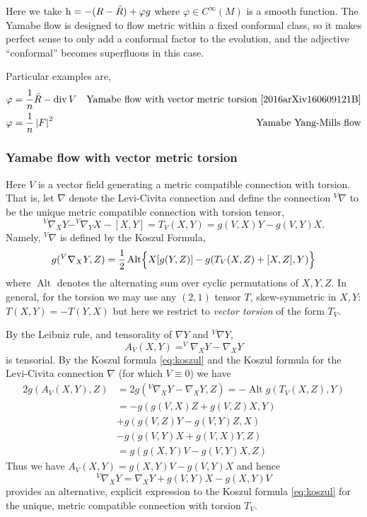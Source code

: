 \documentclass{amsart}
\begin{document}
Here we take \(\operatorname{h} = -(R - \bar{R}) + \varphi g\) where \(\varphi \in C^{\infty}(M)\) is a smooth function. The Yamabe flow is designed to flow metric within a fixed conformal class, so it makes perfect sense to only add a conformal factor to the evolution, and the adjective ``conformal'' becomes superfluous in this case.

Particular examples are,
\begin{align*}
\varphi &= \frac{1}{n} \bar{R} - \operatorname{div} V & \text{Yamabe flow with vector metric torsion \cite{2016arXiv160609121B}} \\
\varphi &= \frac{1}{n} \left|{F}\right|^2 & \text{Yamabe Yang-Mills flow}
\end{align*}

\subsubsection*{Yamabe flow with vector metric torsion}

Here \(V\) is a vector field generating a metric compatible connection with torsion. That is, let \(\nabla\) denote the Levi-Civita connection and define the connection \(^{V}\nabla\) to be the unique metric compatible connection with torsion tensor,
\begin{equation}
\label{eq:vector_torsion}
^{V}\nabla_X Y - ^{V}\nabla_Y X - [X, Y] = T_V(X, Y) = g(V, X) Y - g(V, Y) X.
\end{equation}
Namely, \(^{V}\nabla\) is defined by the Koszul Formula,
\begin{equation}
\label{eq:koszul}
g(^{V}\nabla_X Y, Z) = \frac{1}{2} \operatorname{Alt} \Bigl\{X[g(Y, Z)] - g(T_V(X, Z) + [X, Z], Y)\Bigr\}
\end{equation}
where $\operatorname{Alt}$ denotes the alternating sum over cyclic permutations of $X, Y, Z$. In general, for the torsion we may use any \((2, 1)\) tensor \(T\), skew-symmetric in \(X, Y\): \(T(X, Y) = -T(Y, X)\) but here we restrict to \emph{vector torsion} of the form \(T_V\).

By the Leibniz rule, and tensorality of \(\nabla Y\) and \(^{V}\nabla Y\),
\[
A_V(X, Y) = ^{V}\nabla_X Y - \nabla_X Y
\]
is tensorial. By the Koszul formula \eqref{eq:koszul} and the Koszul formula for the Levi-Civita connection \(\nabla\) (for which \(V \equiv 0\)) we have
\[
\begin{split}
2 g(A_V(X, Y), Z) &= 2 g(^{V}\nabla_X Y - \nabla_X Y, Z) = -\operatorname{Alt} g(T_V (X, Z), Y) \\
&= -g(g(V, X) Z + g(V, Z) X, Y) \\
&+ g(g(V, Z) Y - g(V, Y) Z, X) \\
&- g(g(V, Y) X + g(V, X) Y, Z) \\
&= g(g(X, Y)V - g(V, Y)X, Z)
\end{split}
\]
Thus we have $A_V(X, Y) = g(X, Y) V - g(V, Y) X$ and hence
\begin{equation}
\label{eq:vector_connection}
^{V}\nabla_X Y = \nabla_X Y + g(V, Y) X - g(X, Y) V
\end{equation}
provides an alternative, explicit expression to the Koszul formula \eqref{eq:koszul} for the unique, metric compatible connection with torsion \(T_V\).
\end{document}

